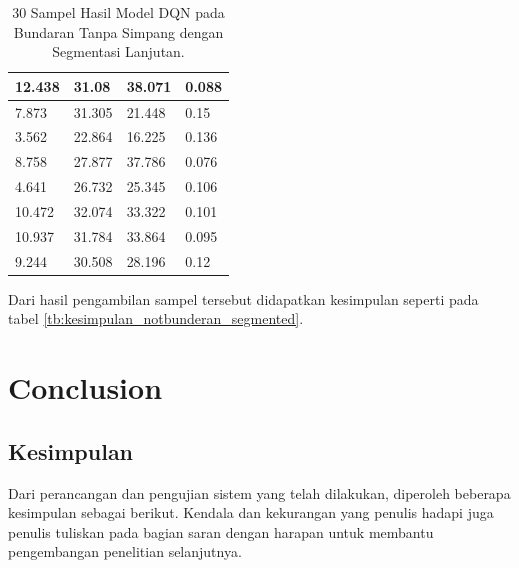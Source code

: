 \documentclass[conference]{IEEEtran}
\begin{document}
\begin{table}[H]
\begin{tabular}{|l|l|l|l|}
			12.438          & 31.08  & 38.071 & 0.088  \\ \hline
			7.873           & 31.305 & 21.448 & 0.15   \\ \hline
			3.562           & 22.864 & 16.225 & 0.136  \\ \hline
			8.758           & 27.877 & 37.786 & 0.076  \\ \hline
			4.641           & 26.732 & 25.345 & 0.106  \\ \hline
			10.472          & 32.074 & 33.322 & 0.101  \\ \hline
			10.937          & 31.784 & 33.864 & 0.095  \\ \hline
			9.244           & 30.508 & 28.196 & 0.12   \\ \hline
		\end{tabular}
		\caption{30 Sampel Hasil Model DQN pada Bundaran Tanpa Simpang dengan Segmentasi Lanjutan.}
		\label{tb:hasilpengujian_notbunderan_segmented}
	\end{table}
	
	Dari hasil pengambilan sampel tersebut didapatkan kesimpulan seperti pada tabel \ref{tb:kesimpulan_notbunderan_segmented}.
	
	\begin{table}[H]
		\caption{Kesimpulan Hasil Model DQN pada Bundaran Tanpa Simpang dengan Segmentasi Lanjutan.}
		\label{tb:kesimpulan_notbunderan_segmented}
	\end{table}
	
	
	\section{Conclusion}
	\vspace{1ex}
	
	\subsection{Kesimpulan}
	\label{sec:kesimpulan}
	
	Dari perancangan dan pengujian sistem yang telah dilakukan, diperoleh beberapa kesimpulan sebagai berikut. Kendala dan kekurangan yang penulis hadapi juga penulis tuliskan pada bagian saran dengan harapan untuk membantu pengembangan penelitian selanjutnya.
	
\end{document}
